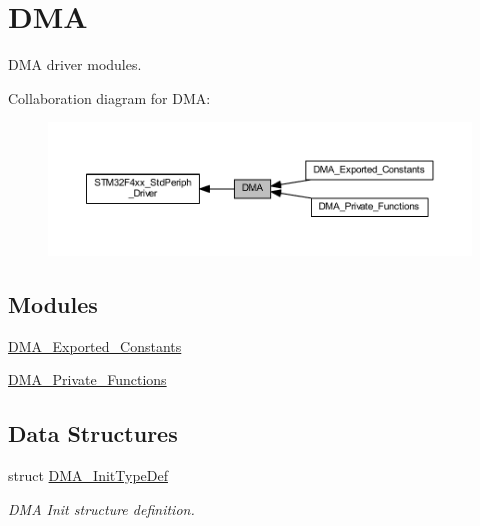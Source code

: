 \hypertarget{group___d_m_a}{}\section{D\+MA}
\label{group___d_m_a}


D\+MA driver modules.  


Collaboration diagram for D\+MA\+:
\nopagebreak
\begin{figure}[H]
\begin{center}
\leavevmode
\includegraphics[width=350pt]{group___d_m_a}
\end{center}
\end{figure}
\subsection*{Modules}
\begin{DoxyCompactItemize}
\item 
\hyperlink{group___d_m_a___exported___constants}{D\+M\+A\+\_\+\+Exported\+\_\+\+Constants}
\item 
\hyperlink{group___d_m_a___private___functions}{D\+M\+A\+\_\+\+Private\+\_\+\+Functions}
\end{DoxyCompactItemize}
\subsection*{Data Structures}
\begin{DoxyCompactItemize}
\item 
struct \hyperlink{struct_d_m_a___init_type_def}{D\+M\+A\+\_\+\+Init\+Type\+Def}
\begin{DoxyCompactList}\small\item\em D\+MA Init structure definition. \end{DoxyCompactList}\end{DoxyCompactItemize}
